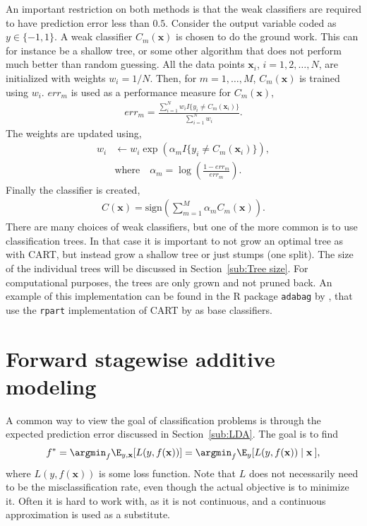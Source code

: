 An important restriction on both methods is that the weak classifiers are required to have prediction error less than $0.5$.
Consider the output variable coded as $y \in \{-1, 1\}$. A weak classifier $C_m(\mathbf{x})$ is chosen to do the ground work. This can for instance be a shallow tree, or some other algorithm that does not perform much better than random guessing. All the data points $\mathbf{x}_i$, $i = 1, 2, \ldots, N$, are initialized with weights $w_i = 1/N$. Then, for $m = 1, \ldots, M$, $C_m(\mathbf{x})$ is trained using $w_i$. $err_m$ is used as a performance measure for $C_m(\mathbf{x})$,
\begin{align}
  err_m =  \frac{\sum^{N}_{i=1} w_i I\{y_i \neq C_m(\mathbf{x}_i)\}}{\sum^{N}_{i=1} w_i}.
\end{align}
The weights are updated using, 
\begin{align}
  w_i &\leftarrow w_i \exp\left( \alpha_m I\{y_i \neq C_m(\mathbf{x}_i)\} \right), \\
  &\text{where} \quad \alpha_m = \log\left(  \frac{1-err_m}{err_m} \right).
\end{align}
Finally the classifier is created,
\begin{align}
  C( \mathbf{x}) = \text{sign}\left( \sum^{M}_{m=1} \alpha_m C_m(\mathbf{x}) \right).
\end{align}
There are many choices of weak classifiers, but one of the more common is to use classification trees. In that case it is important to not grow an optimal tree as with CART, but instead grow a shallow tree or just stumps (one split). The size of the individual trees will be discussed in Section~\ref{sub:Tree size}. For computational purposes, the trees are only grown and not pruned back.
An example of this implementation can be found in the R package \verb+adabag+ by \cite{adabag}, that use the \verb+rpart+ implementation of CART by \cite{rpart} as base classifiers.

\section{Forward stagewise additive modeling}
\label{sec:Forward stagewise additive modeling}
A common way to view the goal of classification problems is through the expected prediction error discussed in Section~\ref{sub:LDA}. The goal is to find
\begin{align}
  \label{eq:fargmin} 
  f^* = \argmin_f \E_{y, \mathbf{x}}[L(y,f(\mathbf{x}))] = \argmin_f \E_y [L(y,f(\mathbf{x})) \mid \mathbf{x}\:] ,
\end{align}
where $L(y, f(\mathbf{x}))$ is some loss function. 
Note that $L$ does not necessarily need to be the misclassification rate, even though the actual objective is to minimize it.
Often it is hard to work with, as it is not continuous, and a continuous approximation is used as a substitute.

